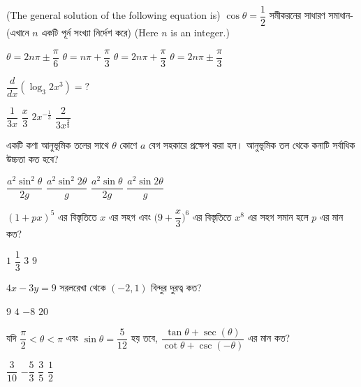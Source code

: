 \documentclass[addpoints]{exam}
\begin{document}
\begin{questions}
\question (The general solution of the following equation is) $ \cos\theta = \dfrac{1}{2} $ সমীকরনের সাধারণ সমাধান- (এখানে $ n $ একটি পূর্ন সংখ্যা নির্দেশ করে) (Here $ n $ is an integer.)

\begin{oneparchoices}
\choice $ \theta = 2n\pi \pm\dfrac{\pi}{6} $
\choice $ \theta = n\pi +\dfrac{\pi}{3} $
\choice $ \theta = 2n\pi +\dfrac{\pi}{3} $
\choice $ \theta = 2n\pi \pm \dfrac{\pi}{3} $
\end{oneparchoices}

\question  $ \dfrac{d}{dx} (\log_{3}2x^{3}) =? $


\begin{oneparchoices}
\choice $ \dfrac{1}{3x} $ 
\choice $ \dfrac{x}{3} $
\choice $ 2x^{-\frac{1}{3}} $
\choice $ \dfrac{2}{3x^{\frac{2}{3}}} $
\end{oneparchoices}

\question একটি কণা আনুভূমিক তলের সাথে $ \theta $ কোণে $ a $ বেগ সহকারে প্রক্ষেপ করা হল। আনুভূমিক তল থেকে কনাটি সর্বাধিক উচ্চতা কত হবে? 

\begin{oneparchoices}
\choice $\dfrac{a^{2}\sin^{2}\theta}{2g} $
\choice $\dfrac{a^{2}\sin^{2}2\theta}{g} $
\choice $\dfrac{a^{2}\sin\theta}{2g} $
\choice $\dfrac{a^{2}\sin 2\theta}{g} $
\end{oneparchoices}


\question $ (1+px)^{5} $ এর বিস্তৃতিতে $ x $ এর সহগ এবং $ \Big(9+\dfrac{x}{3}\Big)^{6} $ এর বিস্তৃতিতে $ x^{8} $ এর সহগ সমান হলে $ p $ এর মান কত?

\begin{oneparchoices}
\choice $ 1 $
\choice $ \dfrac{1}{3} $
\choice $ 3 $
\choice $ 9 $
\end{oneparchoices}

\question  $ 4x-3y=9 $ সরলরেখা থেকে $ (-2,1) $ বিন্দুর দুরত্ব কত?

\begin{oneparchoices}
\choice $ 9 $
\choice $ 4 $
\choice $ -8 $
\choice $ 20 $
\end{oneparchoices}

\question যদি $ \dfrac{\pi}{2}<\theta<\pi $ এবং $ \sin\theta =\dfrac{5}{12} $ হয় তবে, $ \dfrac{\tan\theta + \sec (\theta)}{\cot\theta + \csc (-\theta)} $ এর মান কত?


\begin{oneparchoices}
\choice $ \dfrac{3}{10} $
\choice $ -\dfrac{5}{3} $
\choice $ \dfrac{3}{5} $
\choice $ \dfrac{1}{2} $
\end{oneparchoices}


\end{questions}
\end{document}
